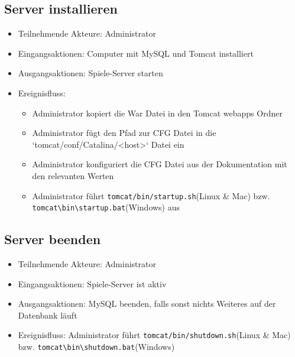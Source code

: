 \documentclass[a4paper]{scrreprt}
\begin{document}
    \subsection{Server installieren}
    \begin{itemize}
        \item Teilnehmende Akteure: \Gls{Administrator} 
        \item Eingangsaktionen: Computer mit MySQL und Tomcat installiert
        \item Ausgangsaktionen: Spiele-Server starten
        \item Ereignisfluss: 
            \begin{itemize}
                \item Administrator kopiert die War Datei in den Tomcat webapps Ordner
                \item Administrator fügt den Pfad zur CFG Datei in die `tomcat/conf/Catalina/<host>` Datei ein
                \item Administrator konfiguriert die CFG Datei aus der Dokumentation mit den relevanten Werten
                \item Administrator führt \texttt{tomcat/bin/startup.sh}(Linux \& Mac) bzw. \texttt{tomcat\textbackslash bin\textbackslash startup.bat}(Windows) aus
            \end{itemize}
    \end{itemize}

    \subsection{Server beenden}
    \begin{itemize}
        \item Teilnehmende Akteure: \Gls{Administrator}
        \item Eingangsaktionen: Spiele-Server ist aktiv
        \item Ausgangsaktionen: MySQL beenden, falls sonst nichts Weiteres auf der Datenbank läuft
        \item Ereignisfluss: Administrator führt \texttt{tomcat/bin/shutdown.sh}(Linux \& Mac) bzw. \texttt{tomcat\textbackslash bin\textbackslash shutdown.bat}(Windows)
    \end{itemize}
\end{document}
